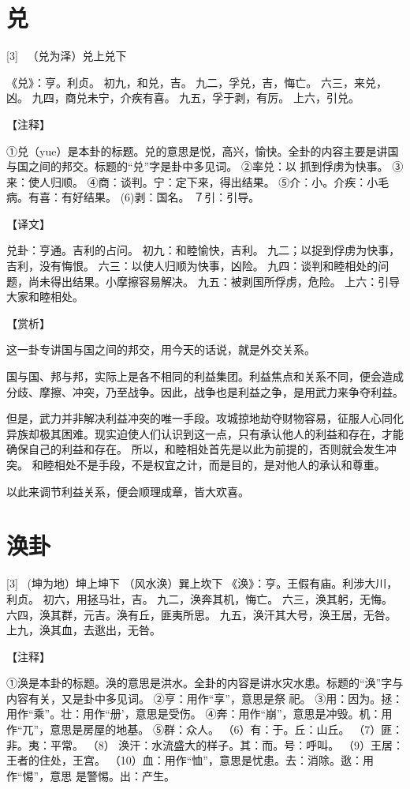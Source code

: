 \documentclass[12pt,UTF8]{ctexbook}
\begin{document}
\chapter{兑}

[3] \ （兑为泽）兑上兑下

《兑》：亨。利贞。
初九，和兑，吉。
九二，孚兑，吉，悔亡。
六三，来兑，凶。
九四，商兑未宁，介疾有喜。
九五，孚于剥，有厉。
上六，引兑。

【注释】

①兑（yue）是本卦的标题。兑的意思是悦，高兴，愉快。全卦的内容主要是讲国与国之间的邦交。标题的“兑”字是卦中多见词。
②率兑：以 抓到俘虏为快事。
③来：使人归顺。
④商：谈判。宁：定下来，得出结果。
⑤介：小。介疾：小毛病。有喜：有好结果。
(6)剥：国名。
７引：引导。

【译文】

兑卦：亨通。吉利的占问。
初九：和睦愉快，吉利。
九二；以捉到俘虏为快事，吉利，没有悔恨。
六三：以使人归顺为快事，凶险。
九四：谈判和睦相处的问题，尚未得出结果。小摩擦容易解决。
九五：被剥国所俘虏，危险。
上六：引导大家和睦相处。

【赏析】

这一卦专讲国与国之间的邦交，用今天的话说，就是外交关系。

国与国、邦与邦，实际上是各不相同的利益集团。利益焦点和关系不同，便会造成分歧、摩擦、冲突，乃至战争。因此，战争也是利益之争，是用武力来争夺利益。

但是，武力并非解决利益冲突的唯一手段。攻城掠地劫夺财物容易，征服人心同化异族却极其困难。现实迫使人们认识到这一点，只有承认他人的利益和存在，才能确保自己的利益和存在。 所以，和睦相处首先是以此为前提的，否则就会发生冲突。 和睦相处不是手段，不是权宜之计，而是目的，是对他人的承认和尊重。

以此来调节利益关系，便会顺理成章，皆大欢喜。

\chapter{涣卦}
[3] \ (坤为地）坤上坤下
（风水涣）巽上坎下
《涣》：亨。王假有庙。利涉大川，利贞。
初六，用拯马壮，吉。
九二，涣奔其机，悔亡。
六三，涣其躬，无悔。
六四，涣其群，元吉。涣有丘，匪夷所思。
九五，涣汗其大号，涣王居，无咎。
上九，涣其血，去逖出，无咎。

【注释】

①涣是本卦的标题。涣的意思是洪水。全卦的内容是讲水灾水患。标题的“涣”字与内容有关，又是卦中多见词。
②亨：用作“享”，意思是祭 祀。
③用：因为。拯：用作“乘”。壮：用作“册’，意思是受伤。
④奔：用作“崩”，意思是冲毁。机：用作“兀”，意思是房屋的地基。
⑤群：众人。
（6）有：于。丘：山丘。
（7）匪：非。夷：平常。
（8） 涣汗：水流盛大的样子。其：而。号：呼叫。
（9）王居：王者的住处，王宫。
（10）血：用作“恤”，意思是忧患。去：消除。逖：用作“惕”，意思 是警惕。出：产生。
\end{document}
